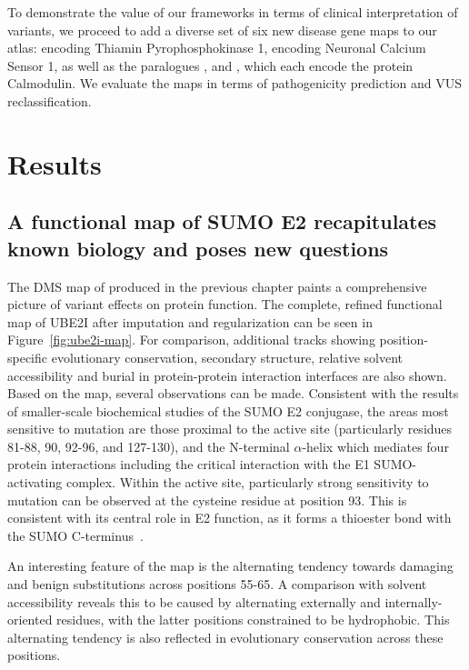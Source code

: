 To demonstrate the value of our frameworks in terms of clinical interpretation of variants, we proceed to add a diverse set of six new disease gene maps to our atlas:  encoding Thiamin Pyrophosphokinase 1,  encoding Neuronal Calcium Sensor 1, as well as the paralogues ,  and , which each encode the protein Calmodulin. We evaluate the maps in terms of pathogenicity prediction and VUS reclassification.

\section{Results}


\subsection{A functional map of SUMO E2 recapitulates known biology and poses new questions}


The DMS map of  produced in the previous chapter paints a comprehensive picture of variant effects on protein function. The complete, refined functional map of UBE2I after imputation and regularization can be seen in Figure~\ref{fig:ube2i-map}. For comparison, additional tracks showing position-specific evolutionary conservation, secondary  structure, relative solvent accessibility and burial in protein-protein interaction interfaces are also shown.  
Based on the map, several observations can be made. Consistent with the results of smaller-scale biochemical studies of the SUMO E2 conjugase\cite{bencsath_identification_2002,bernier-villamor_structural_2002}, the areas most sensitive to mutation are those proximal to the active site (particularly residues 81-88, 90, 92-96, and 127-130), and the N-terminal $\alpha$-helix which mediates four protein interactions including the critical interaction with the E1 SUMO-activating complex. Within the active site, particularly strong sensitivity to mutation can be observed at the cysteine residue at position 93. This is consistent with its central role in E2 function, as it forms a thioester bond with the SUMO C-terminus~\cite{bernier-villamor_structural_2002}.

An interesting feature of the map is the alternating tendency towards damaging and benign substitutions across positions 55-65. A comparison with solvent accessibility reveals this to be caused by alternating externally and internally-oriented residues, with the latter positions constrained to be hydrophobic. This alternating tendency is also reflected in evolutionary conservation across these positions. 


